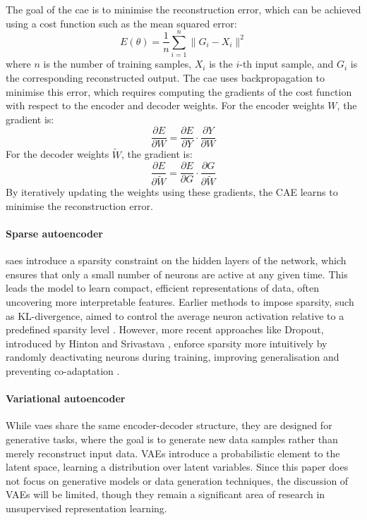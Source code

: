 The goal of the \acrshort{cae} is to minimise the reconstruction error, which can be achieved using a cost function such as the mean squared error:
\[
E(\theta) = \frac{1}{n} \sum_{i=1}^{n} \| G_i - X_i \|^2
\]
where $n$ is the number of training samples, $X_i$ is the $i$-th input sample, and $G_i$ is the corresponding reconstructed output. The \acrshort{cae} uses backpropagation to minimise this error, which requires computing the gradients of the cost function with respect to the encoder and decoder weights. For the encoder weights $W$, the gradient is:
\[
\frac{\partial E}{\partial W} = \frac{\partial E}{\partial Y} \cdot \frac{\partial Y}{\partial W}
\]
For the decoder weights $\tilde{W}$, the gradient is:
\[
\frac{\partial E}{\partial \tilde{W}} = \frac{\partial E}{\partial G} \cdot \frac{\partial G}{\partial \tilde{W}}
\]
By iteratively updating the weights using these gradients, the CAE learns to minimise the reconstruction error.

\paragraph{Sparse autoencoder} \acrshort{sae}s introduce a sparsity constraint on the hidden layers of the network, which ensures that only a small number of neurons are active at any given time. This leads the model to learn compact, efficient representations of data, often uncovering more interpretable features. Earlier methods to impose sparsity, such as KL-divergence, aimed to control the average neuron activation relative to a predefined sparsity level \cite{ng_sparse_2010}. However, more recent approaches like Dropout, introduced by Hinton and Srivastava \cite{hinton_improving_2012, srivastava_dropout_2014}, enforce sparsity more intuitively by randomly deactivating neurons during training, improving generalisation and preventing co-adaptation \cite{muhaddisa_barat_ali_use_2015}.

\paragraph{Variational autoencoder} While \acrshort{vae}s share the same encoder-decoder structure, they are designed for generative tasks, where the goal is to generate new data samples rather than merely reconstruct input data. VAEs introduce a probabilistic element to the latent space, learning a distribution over latent variables. Since this paper does not focus on generative models or data generation techniques, the discussion of VAEs will be limited, though they remain a significant area of research in unsupervised representation learning.



